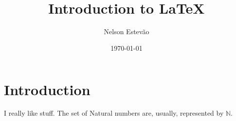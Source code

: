\documentclass[11pt,a4paper]{article}
\title{Introduction to \LaTeX}
\author{Nelson Estevão}
\date{\today}
\begin{document}
\maketitle

\section{Introduction}

I really like stuff. The set of Natural numbers are, usually, represented by $\mathbb{N}$.
\end{document}
